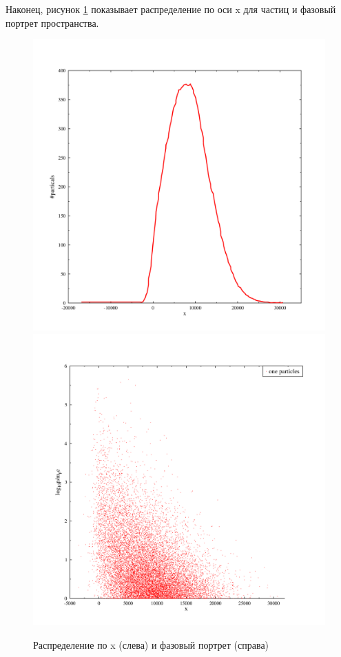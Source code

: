 \documentclass[a4paper,14pt]{extarticle} %
\begin{document}
Наконец, рисунок \ref{res/stoh/x} показывает распределение по оси x для частиц и фазовый портрет пространства.
\begin{figure}[!htb]
\centering
\includegraphics[width=0.3\linewidth]{stoh_x}
\includegraphics[width=0.3\linewidth]{stoh_px}

\caption{Распределение по x (слева) и фазовый портрет (справа)}
\label{res/stoh/x}
\end{figure}



\end{document}

